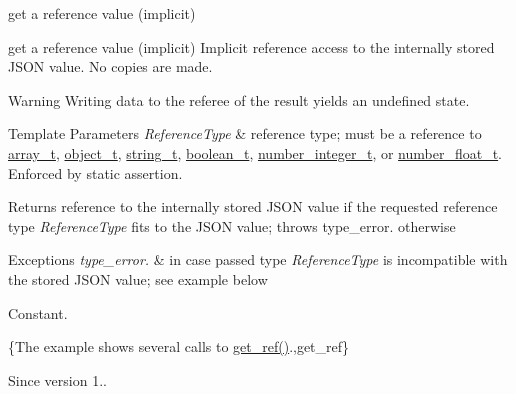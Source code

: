 get a reference value (implicit) 

get a reference value (implicit) Implicit reference access to the internally stored J\+S\+ON value. No copies are made.

\begin{DoxyWarning}{Warning}
Writing data to the referee of the result yields an undefined state.
\end{DoxyWarning}

\begin{DoxyTemplParams}{Template Parameters}
{\em Reference\+Type} & reference type; must be a reference to \hyperlink{classnlohmann_1_1basic__json_a4c409f1b6d9caf3412c78af9a5883fed}{array\+\_\+t}, \hyperlink{classnlohmann_1_1basic__json_a0322396ca5cd4623bc816bf735377623}{object\+\_\+t}, \hyperlink{classnlohmann_1_1basic__json_a61f8566a1a85a424c7266fb531dca005}{string\+\_\+t}, \hyperlink{classnlohmann_1_1basic__json_a4c919102a9b4fe0d588af64801436082}{boolean\+\_\+t}, \hyperlink{classnlohmann_1_1basic__json_a98e611d67b7bd75307de99c9358ab2dc}{number\+\_\+integer\+\_\+t}, or \hyperlink{classnlohmann_1_1basic__json_a88d6103cb3620410b35200ee8e313d97}{number\+\_\+float\+\_\+t}. Enforced by static assertion.\\
\hline
\end{DoxyTemplParams}
\begin{DoxyReturn}{Returns}
reference to the internally stored J\+S\+ON value if the requested reference type {\itshape Reference\+Type} fits to the J\+S\+ON value; throws type\+\_\+error. otherwise
\end{DoxyReturn}

\begin{DoxyExceptions}{Exceptions}
{\em type\+\_\+error.} & in case passed type {\itshape Reference\+Type} is incompatible with the stored J\+S\+ON value; see example below\\
\hline
\end{DoxyExceptions}
Constant.

\{The example shows several calls to {\ttfamily \hyperlink{classnlohmann_1_1basic__json_afbd800010b67619463c0fce6e74f7878}{get\+\_\+ref()}}.,get\+\_\+ref\}

\begin{DoxySince}{Since}
version 1.. 
\end{DoxySince}
